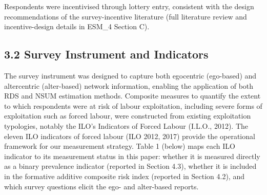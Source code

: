 \documentclass[
  12pt,
  letterpaper,
  DIV=11,
  numbers=noendperiod]{scrartcl}
\begin{document}
Respondents were incentivised through lottery entry, consistent with the
design recommendations of the survey-incentive literature (full
literature review and incentive-design details in ESM\_4 Section C).

\subsection{3.2 Survey Instrument and
Indicators}\label{survey-instrument-and-indicators}

The survey instrument was designed to capture both egocentric
(ego-based) and altercentric (alter-based) network information, enabling
the application of both RDS and NSUM estimation methods. Composite
measures to quantify the extent to which respondents were at risk of
labour exploitation, including severe forms of exploitation such as
forced labour, were constructed from existing exploitation typologies,
notably the ILO's Indicators of Forced Labour (I.L.O., 2012). The eleven
ILO indicators of forced labour (ILO 2012, 2017) provide the operational
framework for our measurement strategy. Table 1 (below) maps each ILO
indicator to its measurement status in this paper: whether it is
measured directly as a binary prevalence indicator (reported in Section
4.3), whether it is included in the formative additive composite risk
index (reported in Section 4.2), and which survey questions elicit the
ego- and alter-based reports.
\end{document}
